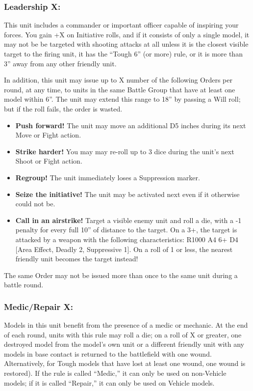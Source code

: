 \begin{multicols}{2}
\subsubsection*{Leadership X:} This unit includes a commander or important officer capable of inspiring your forces. You gain +X on Initiative rolls, and if it consists of only a single model, it may not be be targeted with shooting attacks at all unless it is the closest visible target to the firing unit, it has the ``Tough 6'' (or more) rule, or it is more than 3'' away from any other friendly unit.

In addition, this unit may issue up to X number of the following Orders per round, at any time, to units in the same Battle Group that have at least one model within 6''. The unit may extend this range to 18'' by passing a Will roll; but if the roll fails, the order is wasted.

\begin{itemize}
    \item \textbf{Push forward!} The unit may move an additional D5 inches during its next Move or Fight action.
    \item \textbf{Strike harder!} You may may re-roll up to 3 dice during the unit's next Shoot or Fight action.
    \item \textbf{Regroup!} The unit immediately loses a Suppression marker.
    \item \textbf{Seize the initiative!} The unit may be activated next even if it otherwise could not be.
    \item \textbf{Call in an airstrike!} Target a visible enemy unit and roll a die, with a -1 penalty for every full 10'' of distance to the target. On a 3+, the target is attacked by a weapon with the following characteristics: R1000 A4 6+ D4 [Area Effect, Deadly 2, Suppressive 1]. On a roll of 1 or less, the nearest friendly unit becomes the target instead!
\end{itemize}

The same Order may not be issued more than once to the same unit during a battle round.

\subsubsection*{Medic/Repair X:} Models in this unit benefit from the presence of a medic or mechanic. At the end of each round, units with this rule may roll a die; on a roll of X or greater, one destroyed model from the model's own unit or a different friendly unit with any models in base contact is returned to the battlefield with one wound. Alternatively, for Tough models that have lost at least one wound, one wound is restored). If the rule is called ``Medic,'' it can only be used on non-Vehicle models; if it is called ``Repair,'' it can only be used on Vehicle models.


\end{multicols}
